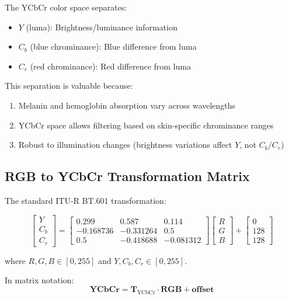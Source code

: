 \documentclass[11pt,a4paper]{article}
\newcommand{\vect}[1]{\bm{#1}}
\newcommand{\mat}[1]{\mathbf{#1}}
\begin{document}
The YCbCr color space separates:
\begin{itemize}
    \item $Y$ (luma): Brightness/luminance information
    \item $C_b$ (blue chrominance): Blue difference from luma
    \item $C_r$ (red chrominance): Red difference from luma
\end{itemize}

This separation is valuable because:
\begin{enumerate}
    \item Melanin and hemoglobin absorption vary across wavelengths
    \item YCbCr space allows filtering based on skin-specific chrominance ranges
    \item Robust to illumination changes (brightness variations affect $Y$, not $C_b$/$C_r$)
\end{enumerate}

\subsection{RGB to YCbCr Transformation Matrix}

The standard ITU-R BT.601 transformation:

\begin{equation}
\begin{bmatrix} Y \\ C_b \\ C_r \end{bmatrix} = 
\begin{bmatrix}
0.299 & 0.587 & 0.114 \\
-0.168736 & -0.331264 & 0.5 \\
0.5 & -0.418688 & -0.081312
\end{bmatrix}
\begin{bmatrix} R \\ G \\ B \end{bmatrix}
+
\begin{bmatrix} 0 \\ 128 \\ 128 \end{bmatrix}
\end{equation}

where $R, G, B \in [0, 255]$ and $Y, C_b, C_r \in [0, 255]$.

In matrix notation:
\begin{equation}
\vect{YCbCr} = \mat{T}_{\text{YCbCr}} \cdot \vect{RGB} + \vect{offset}
\end{equation}
\end{document}
